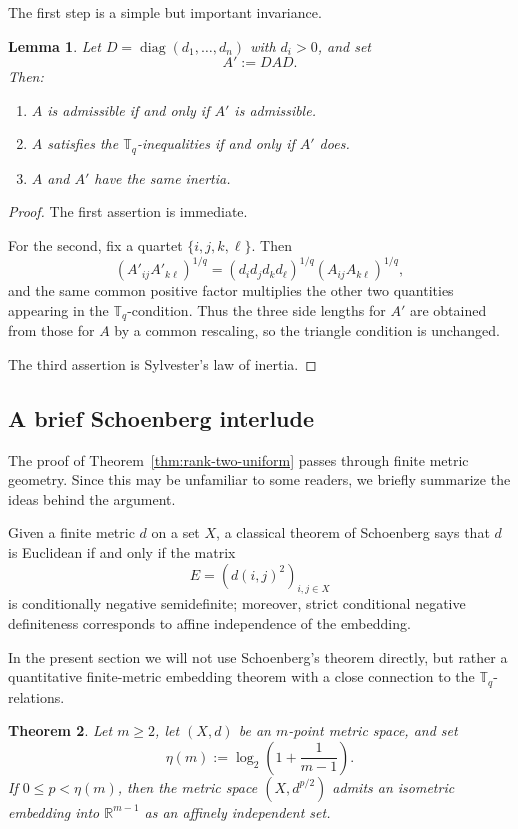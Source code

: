 \documentclass[12pt]{amsart}
\newtheorem{theorem}{Theorem}[section]
\newtheorem{lemma}[theorem]{Lemma}
\theoremstyle{definition}
\newcommand{\1}{\mathbf{1}}
\newcommand{\diag}{\operatorname{diag}}
\newcommand\R{{\mathbb R}}
\newcommand\T{{\mathbb T}}
\begin{document}
The first step is a simple but important invariance.

\begin{lemma}
\label{lem:diag-congruence-U2n}
Let $D=\diag(d_1,\dots,d_n)$ with $d_i>0$, and set
\[
A' := DAD.
\]
Then:
\begin{enumerate}
\item $A$ is admissible if and only if $A'$ is admissible.
\item $A$ satisfies the $\T_q$-inequalities if and only if $A'$ does.
\item $A$ and $A'$ have the same inertia.
\end{enumerate}
\end{lemma}

\begin{proof}
The first assertion is immediate.

For the second, fix a quartet $\{i,j,k,\ell\}$. Then
\[
(A'_{ij}A'_{k\ell})^{1/q}
=
(d_id_jd_kd_\ell)^{1/q}(A_{ij}A_{k\ell})^{1/q},
\]
and the same common positive factor multiplies the other two quantities appearing in the
$\T_q$-condition. Thus the three side lengths for $A'$ are obtained from those for $A$
by a common rescaling, so the triangle condition is unchanged.

The third assertion is Sylvester's law of inertia.
\end{proof}


\subsection{A brief Schoenberg interlude}

The proof of Theorem~\ref{thm:rank-two-uniform} passes through finite metric geometry. Since
this may be unfamiliar to some readers, we briefly summarize the ideas behind the argument.

Given a finite metric $d$ on a set $X$, a classical theorem of Schoenberg \cite{Schoenberg1938} says that
$d$ is Euclidean if and only if the matrix
\[
E=(d(i,j)^2)_{i,j\in X}
\]
is conditionally negative semidefinite; moreover, strict conditional negative definiteness
corresponds to affine independence of the embedding. 

In the present section we will not use Schoenberg's theorem directly, but rather a
quantitative finite-metric embedding theorem with a close connection to the $\T_q$-relations.

\begin{theorem}
\label{thm:snowflake-embedding}
Let $m\ge 2$, let $(X,d)$ be an $m$-point metric space, and set
\[
\eta(m):=\log_2\!\left(1+\frac{1}{m-1}\right).
\]
If $0\le p<\eta(m)$, then the metric space $(X,d^{p/2})$ admits an
isometric embedding into $\R^{m-1}$ as an affinely independent set.  
\end{theorem}
\end{document}
